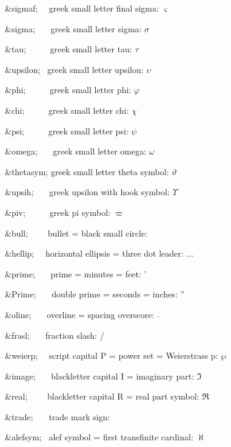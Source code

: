 \begin{DoxyItemize}
\item {\ttfamily \&sigmaf;}{\ttfamily ~~} greek small letter final sigma\+: {$\varsigma$} 
\item {\ttfamily \&sigma;}{\ttfamily ~~~} greek small letter sigma\+: {$\sigma$} 
\item {\ttfamily \&tau;}{\ttfamily ~~~~~} greek small letter tau\+: {$\tau$} 
\item {\ttfamily \&upsilon;}{\ttfamily ~} greek small letter upsilon\+: {$\upsilon$} 
\item {\ttfamily \&phi;}{\ttfamily ~~~~~} greek small letter phi\+: {$\varphi$} 
\item {\ttfamily \&chi;}{\ttfamily ~~~~~} greek small letter chi\+: {$\chi$} 
\item {\ttfamily \&psi;}{\ttfamily ~~~~~} greek small letter psi\+: {$\psi$} 
\item {\ttfamily \&omega;}{\ttfamily ~~~} greek small letter omega\+: {$\omega$} 
\item {\ttfamily \&thetasym;} greek small letter theta symbol\+: {$\vartheta$} 
\item {\ttfamily \&upsih;}{\ttfamily ~~~} greek upsilon with hook symbol\+: {$\Upsilon$} 
\item {\ttfamily \&piv;}{\ttfamily ~~~~~} greek pi symbol\+: {$\varpi$} 
\item {\ttfamily \&bull;}{\ttfamily ~~~~} bullet = black small circle\+: \textbullet{} 
\item {\ttfamily \&hellip;}{\ttfamily ~~} horizontal ellipsis = three dot leader\+: {$\dots$} 
\item {\ttfamily \&prime;}{\ttfamily ~~~} prime = minutes = feet\+: ' 
\item {\ttfamily \&Prime;}{\ttfamily ~~~} double prime = seconds = inches\+: '' 
\item {\ttfamily \&oline;}{\ttfamily ~~~} overline = spacing overscore\+: {$\overline{\,}$} 
\item {\ttfamily \&frasl;}{\ttfamily ~~~} fraction slash\+: / 
\item {\ttfamily \&weierp;}{\ttfamily ~~} script capital P = power set = Weierstrass p\+: {$\wp$} 
\item {\ttfamily \&image;}{\ttfamily ~~~} blackletter capital I = imaginary part\+: {$\Im$} 
\item {\ttfamily \&real;}{\ttfamily ~~~~} blackletter capital R = real part symbol\+: {$\Re$} 
\item {\ttfamily \&trade;}{\ttfamily ~~~} trade mark sign\+: \texttrademark{} 
\item {\ttfamily \&alefsym;}{\ttfamily ~} alef symbol = first transfinite cardinal\+: {$\aleph$} 

\end{DoxyItemize}
